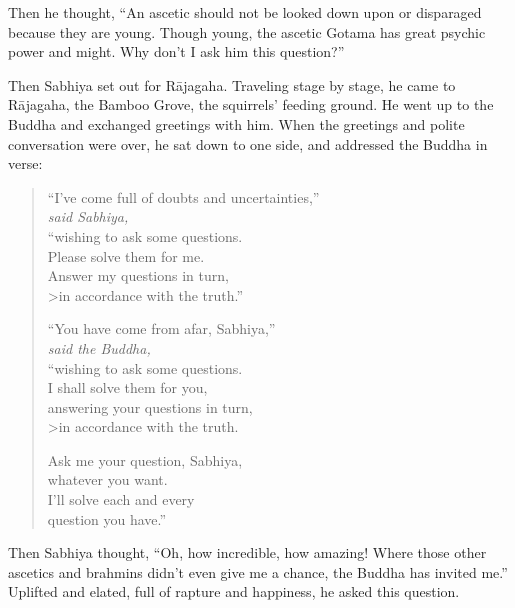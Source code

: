 \documentclass[12pt,openany]{book}%
\newcommand*{\scspeaker}[1]{\hspace{2em}\textit{#1}}
\begin{document}
Then he thought, “An ascetic should not be looked down upon or disparaged because they are young. Though young, the ascetic Gotama has great psychic power and might. Why don’t I ask him this question?” 

Then Sabhiya set out for \textsanskrit{Rājagaha}. Traveling stage by stage, he came to \textsanskrit{Rājagaha}, the Bamboo Grove, the squirrels’ feeding ground. He went up to the Buddha and exchanged greetings with him. When the greetings and polite conversation were over, he sat down to one side, and addressed the Buddha in verse: 

\begin{verse}%
“I’ve come full of  doubts and uncertainties,” \\
\scspeaker{said Sabhiya, }\\
“wishing to ask some questions. \\
Please solve them for me. \\
Answer my questions in turn, \\>in accordance with the truth.” 

“You have come from afar, Sabhiya,” \\
\scspeaker{said the Buddha, }\\
“wishing to ask some questions. \\
I shall solve them for you, \\
answering your questions in turn, \\>in accordance with the truth. 

Ask me your question, Sabhiya, \\
whatever you want. \\
I’ll solve each and every \\
question you have.” 

%
\end{verse}

Then Sabhiya thought, “Oh, how incredible, how amazing! Where those other ascetics and brahmins didn’t even give me a chance, the Buddha has invited me.” Uplifted and elated, full of rapture and happiness, he asked this question. 
\end{document}
